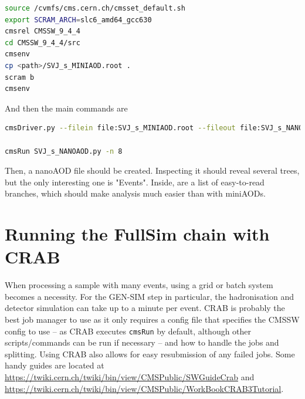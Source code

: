 \begin{lstlisting}[belowskip=-0.7cm, language=sh, numbers=none]
source /cvmfs/cms.cern.ch/cmsset_default.sh
export SCRAM_ARCH=slc6_amd64_gcc630
cmsrel CMSSW_9_4_4
cd CMSSW_9_4_4/src
cmsenv
cp <path>/SVJ_s_MINIAOD.root .
scram b
cmsenv
\end{lstlisting}

And then the main commands are

\begin{lstlisting}[belowskip=-0.7cm, language=sh, numbers=none]
cmsDriver.py --filein file:SVJ_s_MINIAOD.root --fileout file:SVJ_s_NANOAOD.root --mc --eventcontent NANOAODSIM --datatier NANOAODSIM --conditions auto:run2_mc -s NANO --era Run2_2016,run2_miniAOD_80XLegacy --python_filename SVJ_s_NANOAOD.py --no_exec -n 250

cmsRun SVJ_s_NANOAOD.py -n 8
\end{lstlisting}

Then, a nanoAOD file should be created. Inspecting it should reveal several trees, but the only interesting one is "Events". Inside, are a list of easy-to-read branches, which should make analysis much easier than with miniAODs.


\section{Running the FullSim chain with CRAB}

When processing a sample with many events, using a grid or batch system becomes a necessity. For the GEN-SIM step in particular, the hadronisation and detector simulation can take up to a minute per event. CRAB is probably the best job manager to use as it only requires a config file that specifies the CMSSW config to use -- as CRAB executes \texttt{cmsRun} by default, although other scripts/commands can be run if necessary -- and how to handle the jobs and splitting. Using CRAB also allows for easy resubmission of any failed jobs. Some handy guides are located at \url{https://twiki.cern.ch/twiki/bin/view/CMSPublic/SWGuideCrab} and \url{https://twiki.cern.ch/twiki/bin/view/CMSPublic/WorkBookCRAB3Tutorial}.

